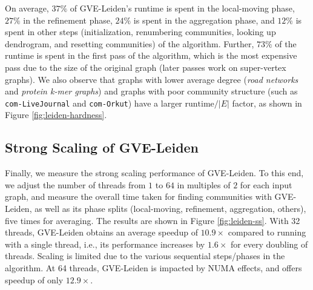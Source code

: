 On average, $37\%$ of GVE-Leiden's runtime is spent in the local-moving phase, $27\%$ in the refinement phase, $24\%$ is spent in the aggregation phase, and $12\%$ is spent in other steps (initialization, renumbering communities, looking up dendrogram, and resetting communities) of the algorithm. Further, $73\%$ of the runtime is spent in the first pass of the algorithm, which is the most expensive pass due to the size of the original graph (later passes work on super-vertex graphs). We also observe that graphs with lower average degree (\textit{road networks} and \textit{protein k-mer graphs}) and graphs with poor community structure (such as \verb|com-LiveJournal| and \verb|com-Orkut|) have a larger $\text{runtime}/|E|$ factor, as shown in Figure \ref{fig:leiden-hardness}.




\subsection{Strong Scaling of GVE-Leiden}

Finally, we measure the strong scaling performance of GVE-Leiden. To this end, we adjust the number of threads from $1$ to $64$ in multiples of $2$ for each input graph, and measure the overall time taken for finding communities with GVE-Leiden, as well as its phase splits (local-moving, refinement, aggregation, others), five times for averaging. The results are shown in Figure \ref{fig:leiden-ss}. With 32 threads, GVE-Leiden obtains an average speedup of $10.9\times$ compared to running with a single thread, i.e., its performance increases by $1.6\times$ for every doubling of threads. Scaling is limited due to the various sequential steps/phases in the algorithm. At 64 threads, GVE-Leiden is impacted by NUMA effects, and offers speedup of only $12.9\times$.
